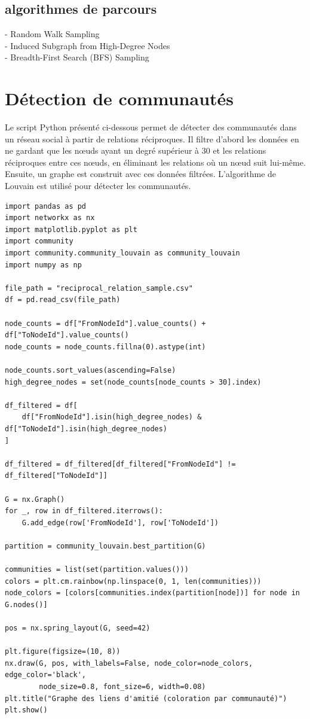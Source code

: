 \documentclass[a4paper, 12pt, twoside]{article}
\begin{document}
\subsection{algorithmes de parcours}
- Random Walk Sampling\\
- Induced Subgraph from High-Degree Nodes\\
- Breadth-First Search (BFS) Sampling\\

\newpage
\section{Détection de communautés}

Le script Python présenté ci-dessous permet de détecter des communautés dans un réseau social à partir de relations réciproques. Il filtre d'abord les données en ne gardant que les nœuds ayant un degré supérieur à 30 et les relations réciproques entre ces nœuds, en éliminant les relations où un nœud suit lui-même. Ensuite, un graphe est construit avec ces données filtrées. L'algorithme de Louvain est utilisé pour détecter les communautés.

\begin{lstlisting}
import pandas as pd
import networkx as nx
import matplotlib.pyplot as plt
import community  
import community.community_louvain as community_louvain
import numpy as np 

file_path = "reciprocal_relation_sample.csv"
df = pd.read_csv(file_path)

node_counts = df["FromNodeId"].value_counts() + df["ToNodeId"].value_counts()
node_counts = node_counts.fillna(0).astype(int)

node_counts.sort_values(ascending=False)
high_degree_nodes = set(node_counts[node_counts > 30].index)

df_filtered = df[
    df["FromNodeId"].isin(high_degree_nodes) & df["ToNodeId"].isin(high_degree_nodes)
]

df_filtered = df_filtered[df_filtered["FromNodeId"] != df_filtered["ToNodeId"]]

G = nx.Graph()
for _, row in df_filtered.iterrows():
    G.add_edge(row['FromNodeId'], row['ToNodeId'])

partition = community_louvain.best_partition(G)

communities = list(set(partition.values()))
colors = plt.cm.rainbow(np.linspace(0, 1, len(communities)))
node_colors = [colors[communities.index(partition[node])] for node in G.nodes()]

pos = nx.spring_layout(G, seed=42)

plt.figure(figsize=(10, 8))
nx.draw(G, pos, with_labels=False, node_color=node_colors, edge_color='black',
        node_size=0.8, font_size=6, width=0.08)
plt.title("Graphe des liens d'amitié (coloration par communauté)")
plt.show()
\end{lstlisting}
\end{document}

